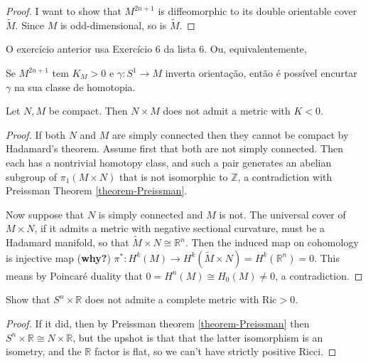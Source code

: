 \begin{proof}
I want to show that $M^{2n+1}$ is diffeomorphic to its double orientable cover
 $\tilde{M}$. Since $M$ is odd-dimensional, so is $\tilde{M}$. 
\end{proof}

O exercício anterior usa Exercício 6 da lista 6. Ou, equivalentemente,

\begin{exercise}
\label{exercise-inverts-orientation-shortened}
Se $M^{2n+1}$ tem $K_M >0$ e $\gamma:S^1 \to M$ inverta orientação, então é
possível encurtar $\gamma$ na sua classe de homotopia.
\end{exercise}

\begin{exercise}
\label{exercise-product-of-compact-does-not-admit-negative-curvature}
Let $N,M$ be compact. Then $N \times M$ does not admit a metric with $K<0$.
\end{exercise}

\begin{proof}
If both $N$ and $M$ are simply connected then they cannot be compact by
Hadamard's theorem. Assume first that both are not simply connected. Then each
has a nontrivial homotopy class, and such a pair generates an abelian subgroup
of $\pi_1(M \times N)$ that is not isomorphic to $\mathbb{Z}$, a contradiction
with Preissman Theorem \ref{theorem-Preissman}.

Now suppose that $N$ is simply connected and $M$ is not. The universal cover of
$M\times N$, if it admits a metric with negative sectional curvature, 
must be a Hadamard manifold, so that $\tilde{M} \times N \cong \mathbb{R}^n$.
Then the induced map on cohomology is injective map ({\bf why?})
$\pi^* :H^{k}(M)\to H^{k}(\tilde{M} \times N)=H^{k}(\mathbb{R}^n)=0$. This means
by Poincaré duality that $0=H^{n}(M)\cong H_0(M)\neq 0$, a contradiction.
\end{proof}

\begin{exercise}
\label{exercise-SnxR-no-positive-Ric}
Show that $S^n \times \mathbb{R}$ does not admite a complete metric with
$\text{Ric}>0$.
\end{exercise}

\begin{proof}
If it did, then by Preissman theorem \ref{theorem-Preissman} then $S^n\times
\mathbb{R}\cong N \times \mathbb{R}$, but the upshot is that that the latter 
isomorphism is an isometry, and the $\mathbb{R}$ factor is flat, so we can't 
have strictly positive Ricci.
\end{proof}

